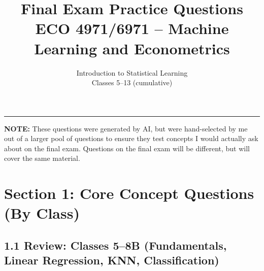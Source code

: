 \documentclass[11pt]{article}
\title{Final Exam Practice Questions\\[0.5em]
  \large ECO 4971/6971 -- Machine Learning and Econometrics}
\author{Introduction to Statistical Learning\\Classes 5--13 (cumulative)}
\date{}
\begin{document}
\maketitle

\bigskip
\hrule
\bigskip

\textbf{NOTE: } These questions were generated by AI, but were hand-selected by me out of a larger pool of questions to ensure they test concepts I would actually ask about on the final exam. Questions on the final exam will be different, but will cover the same material. 

\section*{Section 1: Core Concept Questions (By Class)}

\subsection*{1.1 Review: Classes 5--8B (Fundamentals, Linear Regression, KNN, Classification)}
\end{document}
